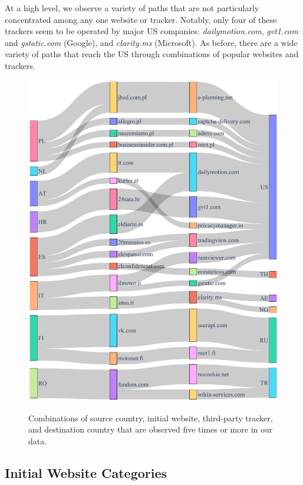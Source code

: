 At a high level, we observe a variety of paths that are not particularly concentrated 
among any one website or tracker. Notably, only four of these trackers seem to be operated by major
US companies: \textit{dailymotion.com}, \textit{gvt1.com} and \textit{gstatic.com} (Google), 
and \textit{clarity.ms} (Microsoft). As before, there are a wide variety of paths that reach the US 
through combinations of popular websites and trackers.

\begin{figure}
    \centering
    \includegraphics[width=\linewidth]{figures/full-flow-no-first-party-alteast-5-pairs.pdf}\\
    \caption{Combinations of
source country, initial website, third-party tracker, and destination country that are observed
five times or more in our data.}
\label{fig:flowcmmntrk}
\end{figure}


\subsection{Initial Website Categories}
\label{sec:categories}

